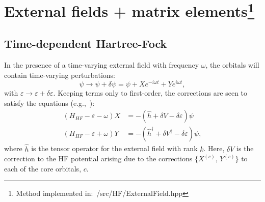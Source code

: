 \documentclass[10pt,twocolumn,a4paper]{article}%
\newcommand{\be}{\begin{equation}}
\newcommand{\ee}{\end{equation}}
\def\en{\ensuremath{\varepsilon}}
\newcommand{\w}{\ensuremath{\omega}}
\begin{document}
\section[External fields + matrix elements]{External fields + matrix elements\label{sec:tdhf}\footnote{Method implemented in:~/src/HF/ExternalField.hpp}}

\subsection{Time-dependent Hartree-Fock}\label{sec:tdhf}


In the presence of a time-varying external field with frequency $\omega$, the orbitals will contain time-varying perturbations:
\be
\psi \to \psi + \delta\psi = \psi +  X e^{- i\w t}+ Y e^{ i\w t},
\ee
with $\en\to\en+\delta\en$.
Keeping terms only to first-order, the corrections are seen to satisfy the equations (e.g.,~\cite{DzubaHFS1984}):
\begin{equation}\begin{split}
\label{eq:tdhf}
\left( H_{HF} - \en -\w \right)X &= -\left(\hat h + \delta V - \delta \en \right)\psi \\
\left( H_{HF} - \en +\w \right)Y &= -\left(\hat h^\dag + \delta V^\dag - \delta \en \right)\psi ,
\end{split}\end{equation}
where $\hat h$ is the tensor operator for the external field with rank $k$.
%
Here, $\delta V$ is the correction to the HF potential arising due to the corrections $\{X^{(c)},\,Y^{(c)}\}$ to each of the core orbitals, $c$.
\end{document}
